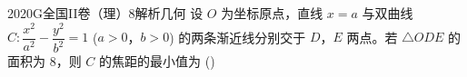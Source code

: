 
\begin{problem}{2020}{G}{全国II卷（理）}{8}{解析几何}
设 $ O $ 为坐标原点，直线 $ x = a $ 与双曲线 $ C\colon \dfrac{x^2}{a^2} - \dfrac{y^2}{b^2} = 1 $ ($ a > 0 $，$ b > 0 $) 的两条渐近线分别交于 $ D $，$ E $ 两点。若 $ \triangle ODE $ 的面积为 $ 8 $，则 $ C $ 的焦距的最小值为 (\hspace{1cm})
\begin{choices}
\end{choices}
\end{problem}

\begin{answer}

\end{answer}

\begin{solutions}

\end{solutions}